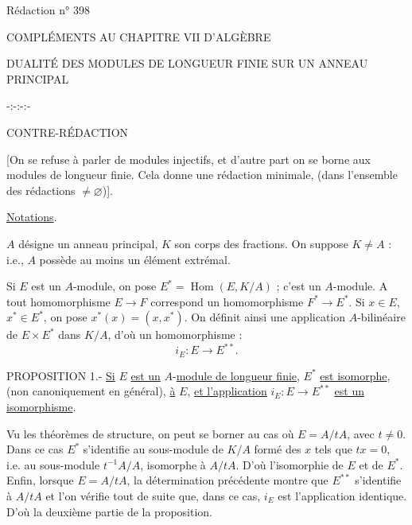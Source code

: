 \hfill Rédaction n° 398

\begin{center}
COMPLÉMENTS AU CHAPITRE VII D'ALGÈBRE

DUALITÉ DES MODULES DE LONGUEUR FINIE SUR UN ANNEAU PRINCIPAL

-:-:-:-

CONTRE-RÉDACTION
\end{center}

[On se refuse à parler de modules injectifs, et d'autre part on se borne aux modules de longueur finie. Cela donne une rédaction minimale, (dans l'ensemble des rédactions $\ne\varnothing$)].

\uline{Notations}.

$A$ désigne un anneau principal, $K$ son corps des fractions. On suppose $K\ne A$ : i.e., $A$ possède au moins un élément extrémal.

Si $E$ est un $A$-module, on pose $E^*=\operatorname{Hom}(E,K/A)$ ; c'est un $A$-module. A tout homomorphisme $E\longrightarrow F$ correspond un homomorphisme $F^*\longrightarrow E^*$. Si $x\in E$, $x^*\in E^*$, on pose $x^*(x)=(x,x^*)$. On définit ainsi une application $A$-bilinéaire de $E\times E^*$ dans $K/A$, d'où un homomorphisme :
\[
i_E:E\longrightarrow E^{**}.
\]

PROPOSITION 1.- \uline{Si} $E$ \uline{est un} $A$-\uline{module de longueur finie}, $E^*$ \uline{est isomorphe}, (non canoniquement en général), \uline{à} $E$, \uline{et l'application} $i_E:E\longrightarrow E^{**}$ \uline{est un isomorphisme}.

Vu les théorèmes de structure, on peut se borner au cas où $E=A/tA$, avec $t\ne0$. Dans ce cas $E^*$ s'identifie au sous-module de $K/A$ formé des $x$ tels que $tx=0$, i.e. au sous-module $t^{-1}A/A$, isomorphe à $A/tA$. D'où l'isomorphie de $E$ et de $E^*$. Enfin, lorsque $E=A/tA$, la détermination précédente montre que $E^{**}$ s'identifie à $A/tA$ et l'on vérifie tout de suite que, dans ce cas, $i_E$ est l'application identique. D'où la deuxième partie de la proposition.
